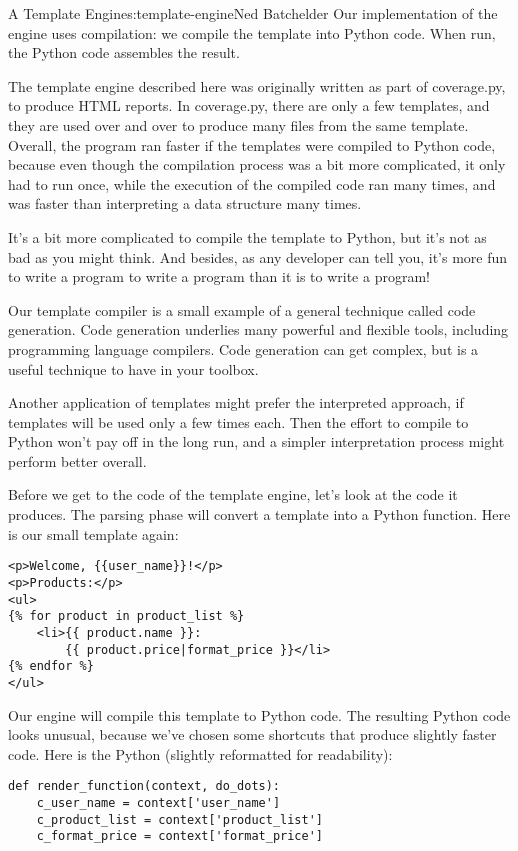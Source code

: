 \begin{aosachapter}{A Template Engine}{s:template-engine}{Ned Batchelder}
Our implementation of the engine uses compilation: we compile the
template into Python code. When run, the Python code assembles the
result.

The template engine described here was originally written as part of
coverage.py, to produce HTML reports. In coverage.py, there are only a
few templates, and they are used over and over to produce many files
from the same template. Overall, the program ran faster if the templates
were compiled to Python code, because even though the compilation
process was a bit more complicated, it only had to run once, while the
execution of the compiled code ran many times, and was faster than
interpreting a data structure many times.

It's a bit more complicated to compile the template to Python, but it's
not as bad as you might think. And besides, as any developer can tell
you, it's more fun to write a program to write a program than it is to
write a program!

Our template compiler is a small example of a general technique called
code generation. Code generation underlies many powerful and flexible
tools, including programming language compilers. Code generation can get
complex, but is a useful technique to have in your toolbox.

Another application of templates might prefer the interpreted approach,
if templates will be used only a few times each. Then the effort to
compile to Python won't pay off in the long run, and a simpler
interpretation process might perform better overall.

\label{compiling-to-python}

Before we get to the code of the template engine, let's look at the code
it produces. The parsing phase will convert a template into a Python
function. Here is our small template again:

\begin{verbatim}
<p>Welcome, {{user_name}}!</p>
<p>Products:</p>
<ul>
{% for product in product_list %}
    <li>{{ product.name }}:
        {{ product.price|format_price }}</li>
{% endfor %}
</ul>
\end{verbatim}

Our engine will compile this template to Python code. The resulting
Python code looks unusual, because we've chosen some shortcuts that
produce slightly faster code. Here is the Python (slightly reformatted
for readability):

\begin{verbatim}
def render_function(context, do_dots):
    c_user_name = context['user_name']
    c_product_list = context['product_list']
    c_format_price = context['format_price']


\end{verbatim}
\end{aosachapter}
